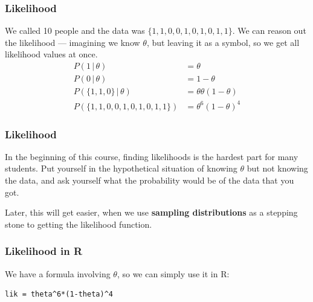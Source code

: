 \documentclass{beamer}
\newcommand{\given}{\,|\,}
\begin{document}
\begin{frame}
\frametitle{Likelihood}
We called 10 people and the data was
$\{1, 1, 0, 0, 1, 0, 1, 0, 1, 1\}$. We can reason out the likelihood
--- imagining we know $\theta$, but leaving it as a symbol, so we get
all likelihood values at once.\pause
\begin{align}
P(1 \given \theta) &= \theta \\
P(0 \given \theta) &= 1-\theta \\
P(\{1, 1, 0\} \given \theta) &= \theta\theta(1-\theta) \\
P(\{1, 1, 0, 0, 1, 0, 1, 0, 1, 1\}) &= \theta^6(1-\theta)^4
\end{align}



\end{frame}

\begin{frame}
\frametitle{Likelihood}
In the beginning of this course, finding likelihoods is the hardest
part for many students. Put yourself in the hypothetical situation
of knowing $\theta$ but not knowing the data, and ask yourself
what the probability would be of the data that you got.\\[1em]\pause

Later, this will get easier, when we use
{\bf sampling distributions}
as a stepping stone to getting the likelihood function.

\end{frame}

\begin{frame}[fragile]
\frametitle{Likelihood in R}
We have a formula involving $\theta$, so we can simply use it
in R:

\begin{verbatim}
lik = theta^6*(1-theta)^4
\end{verbatim}

\end{frame}
\end{document}
